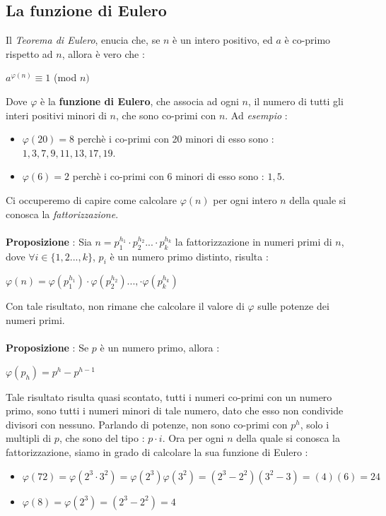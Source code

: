 \documentclass[12pt, letterpaper]{article}
\begin{document}
\subsection{La funzione di Eulero}\label{EulerFunc}
Il \textit{Teorema di Eulero}, enucia che, se \(n\) è un intero positivo, ed \(a\) è co-primo rispetto ad \(n\), allora
è vero che :
\begin{center}
    \(a^{\varphi(n)}\equiv 1\) (mod \(n)\)
\end{center} 
Dove \(\varphi\) è la \textbf{funzione di Eulero}, che associa ad ogni \(n\), il numero di tutti gli interi 
positivi minori di \(n\), che sono co-primi con \(n\). Ad \textit{esempio} :\begin{itemize}
    \item \(\varphi(20)=8\) perchè i co-primi con 20 minori di esso sono : \(1,3,7,9,11,13,17,19\).
    \item \(\varphi(6)=2\) perchè i co-primi con 6 minori di esso sono : \(1,5\).
\end{itemize}
Ci occuperemo di capire come calcolare \(\varphi(n)\) per ogni intero \(n\) della quale si conosca la \textit{fattorizzazione}.
\\\hphantom{.}\\\textbf{Proposizione} : Sia \(n=p_1^{h_1}\cdot p_2^{h_2}...\cdot p_k^{h_k}\) la fattorizzazione in numeri 
primi di \(n\), dove \(\forall i \in \{1,2...,k\}\), \(p_i\) è un numero primo distinto, risulta :\begin{center}
    \(
        \varphi(n)=  \varphi(p_1^{h_1})\cdot\varphi(p_2^{h_2})...,\cdot  \varphi(p_k^{h_k})
    \)
\end{center}
Con tale risultato, non rimane che calcolare il valore di \(\varphi\) sulle potenze dei numeri primi.
\\\hphantom{.}\\\textbf{Proposizione }: Se \(p\) è un numero primo, allora :\begin{center}
    \(
        \varphi(p_{h}) = p^h-p^{h-1} 
    \)
\end{center}
Tale risultato risulta quasi scontato, tutti i numeri co-primi con un numero primo, sono tutti i numeri minori 
di tale numero, dato che esso non condivide divisori con nessuno. Parlando di potenze, non sono co-primi con 
\(p^h\), solo i multipli di \(p\), che sono del tipo : \(p\cdot i\). Ora per ogni \(n\) della quale si conosca la fattorizzazione, 
siamo in grado di calcolare la sua funzione di Eulero : \begin{itemize}
    \item \(\varphi(72)=\varphi(2^3\cdot 3^2)=\varphi(2^3)\varphi(3^2)=(2^3-2^2)(3^2-3)=(4)(6)=24\)
    \item \(\varphi(8)=\varphi(2^3)=(2^3-2^2)=4\)
\end{itemize}
\end{document}
